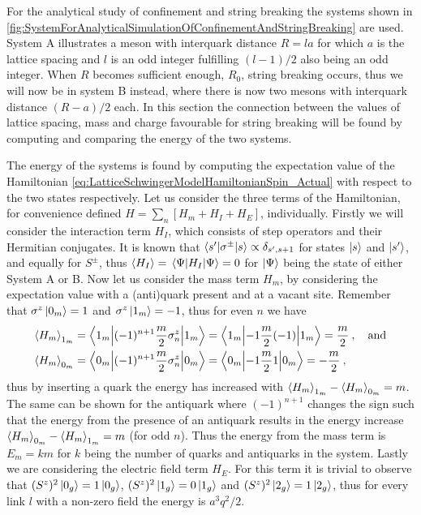 \documentclass[../main.tex]{subfiles} %
\begin{document}
For the analytical study of confinement and string breaking the systems shown in \cref{fig:SystemForAnalyticalSimulationOfConfinementAndStringBreaking} are used. System A illustrates a meson with interquark distance $R = la$ for which $a$ is the lattice spacing and $l$ is an odd integer fulfilling $(l-1)/2$ also being an odd integer. When $R$ becomes sufficient enough, $R_0$, string breaking occurs, thus we will now be in system B instead, where there is now two mesons with interquark distance $(R-a)/2$ each. In this section the connection between the values of lattice spacing, mass and charge favourable for string breaking will be found by computing and comparing the energy of the two systems.

The energy of the systems is found by computing the expectation value of the Hamiltonian \cref{eq:LatticeSchwingerModelHamiltonianSpin_Actual} with respect to the two states respectively. Let us consider the three terms of the Hamiltonian, for convenience defined $H = \sum_n \left[ H_m + H_I + H_E \right]$, individually. Firstly we will consider the interaction term $H_I$, which consists of step operators and their Hermitian conjugates. It is known that $\mel**{s'}{\sigma^\pm}{s} \propto \delta_{s',s+1}$ for states $\ket{s}$ and $\ket{s'}$, and equally for $S^\pm$, thus $\expval{H_I} = \expval{H_I}{\Psi} = 0$ for $\ket{\Psi}$ being the state of either System A or B.
Now let us consider the mass term $H_m$, by considering the expectation value with a (anti)quark present and at a vacant site. Remember that $\sigma^z\ket{0_m} = 1$ and $\sigma^z\ket{1_m} = -1$, thus for even $n$ we have
\begin{align}
\begin{split}
    \expval{H_m}_{1_m} &= \mel**{1_m}{(-1)^{n+1} \frac{m}{2} \sigma_n^z}{1_m}
        = \mel**{1_m}{-1 \frac{m}{2} (-1)}{1_m}
        = \frac{m}{2} \: ,
    \quad \text{and} \\
    \expval{H_m}_{0_m} &= \mel**{0_m}{(-1)^{n+1} \frac{m}{2} \sigma_n^z}{0_m}
        = \mel**{0_m}{-1 \frac{m}{2} 1}{0_m}
        = -\frac{m}{2} \: ,
\end{split}
\end{align}
thus by inserting a quark the energy has increased with $\expval{H_m}_{1_m} - \expval{H_m}_{0_m} = m$. The same can be shown for the antiquark where $(-1)^{n+1}$ changes the sign such that the energy from the presence of an antiquark results in the energy increase $\expval{H_m}_{0_m} - \expval{H_m}_{1_m} = m$ (for odd $n$). Thus the energy from the mass term is $E_m = km$ for $k$ being the number of quarks and antiquarks in the system.
Lastly we are considering the electric field term $H_E$. For this term it is trivial to observe that $(S^z)^2\ket{0_g} = 1\ket{0_g}$, $(S^z)^2\ket{1_g} = 0 \ket{1_g}$ and $(S^z)^2\ket{2_g} = 1\ket{2_g}$, thus for every link $l$ with a non-zero field the energy is $a^3 q^2 / 2$.
\end{document}
